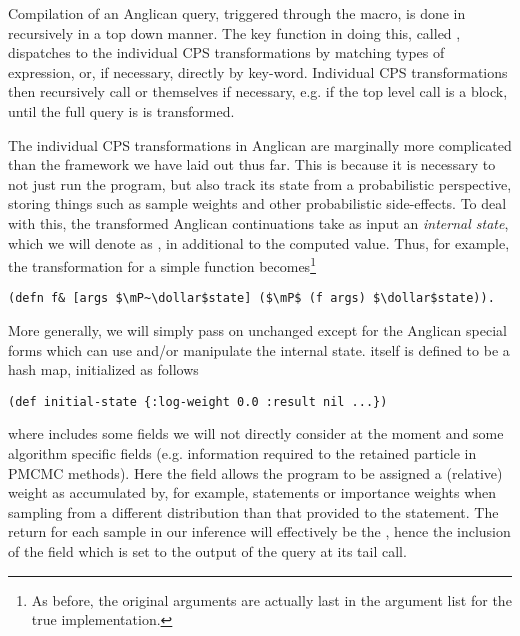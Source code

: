 Compilation of an Anglican query, triggered through the \query macro, is done in recursively
in a top down manner.  The key function in doing this, called ,
dispatches to the individual CPS transformations by matching types of expression, or, if necessary,
directly by key-word.  Individual CPS transformations then recursively call 
or themselves if necessary, e.g. if the top level call is a  block, until the full query is
is transformed.  

The individual CPS transformations in Anglican are marginally more complicated than the
framework we have laid out thus far.  This is because it is necessary to not just run the
program, but also track its state from a probabilistic perspective, storing things such
as sample weights and other probabilistic side-effects.  To deal with this, the transformed Anglican
continuations take as input an \emph{internal state}, which we will denote as \angstate,
in additional to the computed value.
Thus, for example, the transformation for a simple function becomes\footnote{As before, the original arguments
	are actually last in the argument list for the true implementation.}
\begin{lstlisting}[basicstyle=\ttfamily\small,frame=none]
  (defn f& [args $\mP~\dollar$state] ($\mP$ (f args) $\dollar$state)).
\end{lstlisting}\vspace{-8pt}
More generally, we will simply pass on \angstate unchanged except for the Anglican
special forms which can use and/or manipulate the internal state.  \angstate itself
is defined to be a hash map, initialized as follows
\begin{lstlisting}[basicstyle=\ttfamily\small,frame=none]
  (def initial-state {:log-weight 0.0 :result nil ...})
\end{lstlisting}\vspace{-8pt}
where  includes some fields we will not directly consider at the moment and some algorithm
specific fields (e.g. information required to the retained particle in PMCMC methods).
Here the field  allows the program to be assigned a
(relative) weight as accumulated by, for example, \observe statements or importance weights
when sampling from a different distribution than that provided to the \sample statement.
The return for each sample in our inference will effectively be the \angstate, hence the inclusion
of the  field which is set to the output of the query at its tail call.

